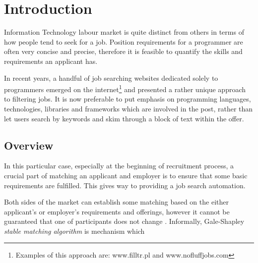\chapter{Introduction}
\ifpdf
    \graphicspath{{Introduction/IntroductionFigs/PNG/}{Introduction/IntroductionFigs/PDF/}{Introduction/IntroductionFigs/}}
\else
    \graphicspath{{Introduction/IntroductionFigs/EPS/}{Introduction/IntroductionFigs/}}
\fi

Information Technology labour market is quite distinct from others in terms of how people tend to seek for a job. Position requirements for a programmer are often very concise and precise, therefore it is feasible to quantify the skills and requirements an applicant has.

In recent years, a handful of job searching websites dedicated solely to programmers emerged on the internet\footnote{Examples of this approach are: www.filltr.pl and www.nofluffjobs.com} and presented a rather unique approach to filtering jobs. It is now preferable to put emphasis on programming languages, technologies, libraries and frameworks which are involved in the post, rather than let users search by keywords and skim through a block of text within the offer.

\section{Overview}
In this particular case, especially at the beginning of recruitment process, a crucial part of matching an applicant and employer is to ensure that some basic requirements are fulfilled. This gives way to providing a job search automation.

Both sides of the market can establish some matching based on the either applicant's or employer's requirements and offerings, however it cannot be guaranteed that one of participants does not change . Informally, Gale-Shapley \textit{stable matching algorithm} is mechanism which 



